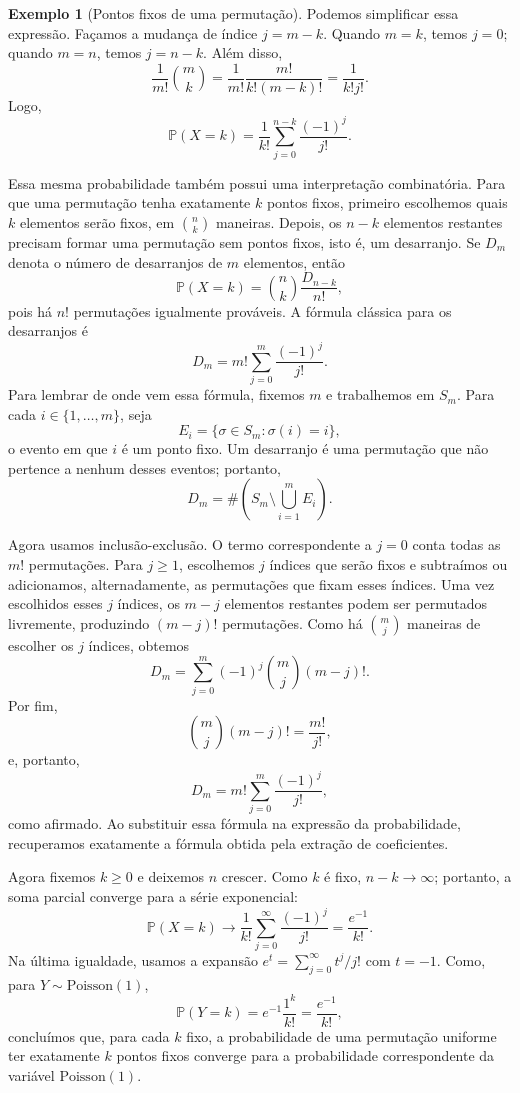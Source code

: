\documentclass[12pt,portuguese]{article}
\theoremstyle{definition}
\newtheorem{example}[example]{Exemplo}
\theoremstyle{plainexercise}
\theoremstyle{starredexercise}
\theoremstyle{definition}
\begin{document}
\begin{example}[Pontos fixos de uma permutação]
Podemos simplificar essa expressão. Façamos a mudança de índice
$j=m-k$. Quando $m=k$, temos $j=0$; quando $m=n$, temos $j=n-k$.
Além disso,
\[
\frac{1}{m!}\binom{m}{k}
=\frac{1}{m!}\frac{m!}{k!(m-k)!}
=\frac{1}{k!j!}.
\]
Logo,
\begin{equation}
\mathbb{P}(X=k)
=\frac{1}{k!}\sum_{j=0}^{n-k}\frac{(-1)^j}{j!}.
\end{equation}

Essa mesma probabilidade também possui uma interpretação combinatória. Para
que uma permutação tenha exatamente $k$ pontos fixos, primeiro escolhemos
quais $k$ elementos serão fixos, em $\binom{n}{k}$ maneiras. Depois, os
$n-k$ elementos restantes precisam formar uma permutação sem pontos fixos,
isto é, um desarranjo. Se $D_m$ denota o número de desarranjos de $m$
elementos, então
\[
\mathbb{P}(X=k)=\binom{n}{k}\frac{D_{n-k}}{n!},
\]
pois há $n!$ permutações igualmente prováveis. A fórmula clássica para os
desarranjos é
\[
D_m=m!\sum_{j=0}^{m}\frac{(-1)^j}{j!}.
\]
Para lembrar de onde vem essa fórmula, fixemos $m$ e trabalhemos em $S_m$.
Para cada $i\in\{1,\ldots,m\}$, seja
\[
E_i=\{\sigma\in S_m:\sigma(i)=i\},
\]
o evento em que $i$ é um ponto fixo. Um desarranjo é uma permutação que não
pertence a nenhum desses eventos; portanto,
\[
D_m=\#\left(S_m\setminus\bigcup_{i=1}^{m}E_i\right).
\]

Agora usamos inclusão-exclusão. O termo correspondente a $j=0$ conta todas
as $m!$ permutações. Para $j\geqslant1$, escolhemos $j$ índices que serão
fixos e subtraímos ou adicionamos, alternadamente, as permutações que fixam
esses índices. Uma vez escolhidos esses $j$ índices, os $m-j$ elementos
restantes podem ser permutados livremente, produzindo $(m-j)!$ permutações.
Como há $\binom{m}{j}$ maneiras de escolher os $j$ índices, obtemos
\[
D_m=\sum_{j=0}^{m}(-1)^j\binom{m}{j}(m-j)!.
\]
Por fim,
\[
\binom{m}{j}(m-j)!=\frac{m!}{j!},
\]
e, portanto,
\[
D_m=m!\sum_{j=0}^{m}\frac{(-1)^j}{j!},
\]
como afirmado. Ao substituir essa fórmula na expressão da probabilidade,
recuperamos exatamente a fórmula obtida pela extração de coeficientes.

Agora fixemos $k\geqslant0$ e deixemos $n$ crescer. Como $k$ é fixo,
$n-k\to\infty$; portanto, a soma parcial converge para a série exponencial:
\[
\mathbb{P}(X=k)\longrightarrow
\frac{1}{k!}\sum_{j=0}^{\infty}\frac{(-1)^j}{j!}
=\frac{e^{-1}}{k!}.
\]
Na última igualdade, usamos a expansão
$e^t=\sum_{j=0}^{\infty}t^j/j!$ com $t=-1$. Como, para
$Y\sim\mathrm{Poisson}(1)$,
\[
\mathbb{P}(Y=k)=e^{-1}\frac{1^k}{k!}=\frac{e^{-1}}{k!},
\]
concluímos que, para cada $k$ fixo, a probabilidade de uma permutação
uniforme ter exatamente $k$ pontos fixos converge para a probabilidade
correspondente da variável $\mathrm{Poisson}(1)$.


\end{example}
\end{document}

